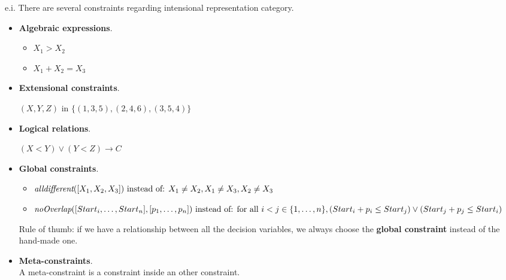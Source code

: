 \begin{example}[title = Intensional constraints examples]
    e.i. There are several constraints regarding intensional representation category. \vspace{7pt}

    \begin{itemize}
        \renewcommand{\labelitemi}{-}
        \item \textbf{Algebraic expressions}. 
        \begin{itemize}
            \item $X_1 > X_2$
            \item $X_1 + X_2 = X_3$
        \end{itemize} 
        \item \textbf{Extensional constraints}. \vspace{1.5pt} 
        \begin{center}
            $(X, Y, Z) \text{ in } \{(1,3,5), (2,4,6), (3,5,4)\}$
        \end{center}
        \item \textbf{Logical relations}. \vspace{1.5pt} 
        \begin{center}
            $(X < Y) \vee (Y < Z) \rightarrow C$
        \end{center}
        \item \textbf{Global constraints}.
        \begin{itemize}
            \item $\textit{alldifferent}([X_1, X_2, X_3]) \text{ instead of: } \vspace{1.5pt} \\ X_1 \neq X_2, X_1 \neq X_3, X_2 \neq X_3$
            \item $\textit{noOverlap}([Start_i, \dots, Start_n], [p_1, \dots, p_n]) \text{ instead of: } \vspace{1.5pt} \\ \text{for all } i < j \in \{1, \dots, n\}, (Start_i + p_i \leq Start_j) \vee (Start_j + p_j \leq Start_i)$
        \end{itemize} \vspace{1.5pt}
        Rule of thumb: if we have a relationship between all the decision variables, we always choose the \textbf{global constraint} instead of the hand-made one.
        \item \textbf{Meta-constraints}. \\ A meta-constraint is a constraint inside an other constraint. \vspace{1.5pt} 

\end{itemize}
\end{example}
